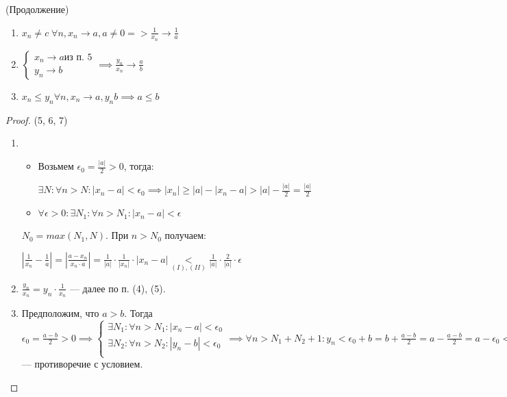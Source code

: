 








\begin{properties} (Продолжение)
    \begin{enumerate}
        \item[5]  $x_n \neq c \; \forall n, x_n \to a, a \neq 0 => \frac{1}{x_n} \to \frac{1}{a}$
        \item[6] $\begin{cases}
                x_n \to a \text{из п. 5} \\
                y_n \to b
        \end{cases} \implies \frac{y_n}{x_n} \to \frac{a}{b}$
        \item[7] $x_n \leq y_n \forall n, x_n \to a, y_n b \implies a \leq b$
    \end{enumerate}
\end{properties}

\begin{proof} (5, 6, 7)
    \begin{enumerate}
        \item[5] 
        \begin{itemize}
            \item[I.] Возьмем $\epsilon_0 = \frac{|a|}{2} > 0$, тогда:
            
            $\exists N: \forall n > N: |x_n - a| < \epsilon_0 \implies |x_n| \geq |a| - |x_n - a| > |a| - \frac{|a|}{2} = \frac{|a|}{2}$
            \item[II.] $\forall \epsilon > 0: \exists N_1: \forall n > N_1: |x_n - a| < \epsilon$
        \end{itemize}

        $N_0 = max(N_1, N)$. При $n > N_0$ получаем:

        $|\frac{1}{x_n} - \frac{1}{a}| = |\frac{a - x_n}{x_n \cdot a}| = \frac{1}{|a|} \cdot \frac{1}{|x_n|} \cdot |x_n - a| \underset{(I), (II)}{<} \frac{1}{|a|} \cdot \frac{2}{|a|} \cdot \epsilon$
        \item[6] $\frac{y_n}{x_n} = y_n \cdot \frac{1}{x_n}$ --- далее по п. (4), (5).
        \item[7] Предположим, что $a > b$. Тогда $\epsilon_0 = \frac{a - b}{2} > 0 \implies \begin{cases}
            \exists N_1: \forall n > N_1: |x_n - a| < \epsilon_0 \\
            \exists N_2: \forall n > N_2: |y_n - b| < \epsilon_0 \\
        \end{cases} \implies \forall n > N_1 + N_2 + 1: y_n < \epsilon_0 + b = b + \frac{a - b}{2} = a - \frac{a - b}{2} = a - \epsilon_0 < x_n \implies y_n < x_n$ --- противоречие с условием.
    \end{enumerate}
\end{proof}


